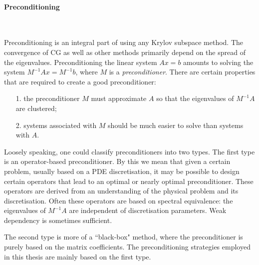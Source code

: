 \documentclass[msc,oneside]{ubcthesis}
\numberwithin{equation}{chapter}    %
\begin{document}
\begin{appendices}
\paragraph{Preconditioning} ~\\

\vspace{-5mm}

Preconditioning is an integral part of using any Krylov subspace method. The convergence of CG as well as other methods primarily depend on the spread of the eigenvalues. Preconditioning the linear system $Ax=b$ amounts to solving the system $M^{-1}Ax = M^{-1}b$, where $M$ is a {\em preconditioner}. There are certain properties that  are required to create a good preconditioner:
\begin{itemize}
    \item[1.] the preconditioner ${M}$ must approximate ${A}$ so that the eigenvalues of $M^{-1}A$ are clustered;
    \item[2.] systems associated with ${M}$ should be much easier to solve than systems with ${A}$.
\end{itemize}
Loosely speaking, one could classify preconditioners into two types. The first type is an operator-based preconditioner. By this we mean that given a certain problem, usually based on a PDE discretisation, it may be possible to design certain operators that lead to an optimal or nearly optimal preconditioner. These operators are derived from an understanding of the physical problem and its discretisation. Often these operators are based on spectral equivalence: the eigenvalues of $M^{-1}A$ are independent of discretisation parameters. Weak dependency is sometimes sufficient.

The second type is more of a ``black-box"  method, where the preconditioner is purely based on the matrix coefficients. The preconditioning strategies employed in this thesis are mainly based on the first type.

\end{appendices}
\end{document}
